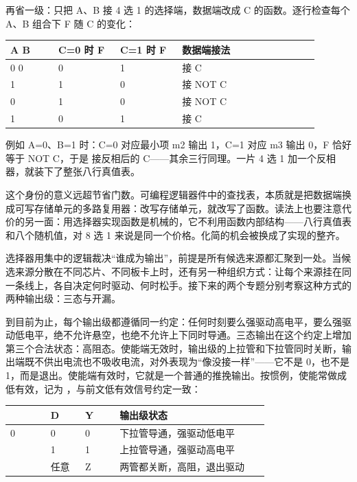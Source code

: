 再省一级：只把 A、B 接 4 选 1 的选择端，数据端改成 C 的函数。逐行检查每个 A、B 组合下 F 随 C 的变化：

\begin{longtable}{L{0.14\linewidth}L{0.18\linewidth}L{0.18\linewidth}L{0.4\linewidth}}
\toprule
A B & C=0 时 F & C=1 时 F & 数据端接法 \\
 0 & 0 & 1 &  接 C \\ 1 & 1 & 0 &  接 NOT C \\ 0 & 1 & 0 &  接 NOT C \\ 1 & 0 & 1 &  接 C \\
\bottomrule
\end{longtable}

例如 A=0、B=1 时：C=0 对应最小项 m2 输出 1，C=1 对应 m3 输出 0，F 恰好等于 NOT C，于是  接反相后的 C——其余三行同理。一片 4 选 1 加一个反相器，就装下了整张八行真值表。

这个身份的意义远超节省门数。可编程逻辑器件中的查找表，本质就是把数据端换成可写存储单元的多路复用器：改写存储单元，就改写了函数。读法上也要注意代价的另一面：用选择器实现函数是机械的，它不利用函数内部结构——八行真值表和八个随机值，对 8 选 1 来说是同一个价格。化简的机会被换成了实现的整齐。

选择器用集中的逻辑裁决“谁成为输出”，前提是所有候选来源都汇聚到一处。当候选来源分散在不同芯片、不同板卡上时，还有另一种组织方式：让每个来源挂在同一条线上，各自决定何时驱动、何时松手。接下来的两个专题分别考察这种方式的两种输出级：三态与开漏。

到目前为止，每个输出级都遵循同一约定：任何时刻要么强驱动高电平，要么强驱动低电平，绝不允许悬空，也绝不允许上下同时导通。三态输出在这个约定上增加第三个合法状态：高阻态。使能端无效时，输出级的上拉管和下拉管同时关断，输出端既不供出电流也不吸收电流，对外表现为“像没接一样”——它不是 0，也不是 1，而是退出。使能端有效时，它就是一个普通的推挽输出。按惯例，使能常做成低有效，记为 ，与前文低有效信号约定一致：

\begin{longtable}{L{0.14\linewidth}L{0.12\linewidth}L{0.12\linewidth}L{0.52\linewidth}}
\toprule
{} & D & Y & 输出级状态 \\
 & 0 & 0 & 下拉管导通，强驱动低电平 \\ & 1 & 1 & 上拉管导通，强驱动高电平 \\ & 任意 & Z & 两管都关断，高阻，退出驱动 \\
\bottomrule
\end{longtable}

